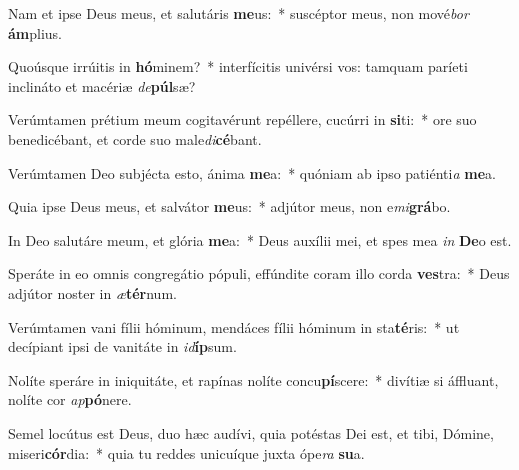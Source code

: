 \item Nam et ipse Deus meus, et salutáris \textbf{me}us:~* suscéptor meus, non mové\textit{bor} \textbf{ám}plius.
\item Quoúsque irrúitis in \textbf{hó}minem?~* interfícitis univérsi vos: tamquam paríeti inclináto et macériæ \textit{de}\textbf{púl}sæ?
\item Verúmtamen prétium meum cogitavérunt repéllere, cucúrri in \textbf{si}ti:~* ore suo benedicébant, et corde suo male\textit{di}\textbf{cé}bant.
\item Verúmtamen Deo subjécta esto, ánima \textbf{me}a:~* quóniam ab ipso patiénti\textit{a} \textbf{me}a.
\item Quia ipse Deus meus, et salvátor \textbf{me}us:~* adjútor meus, non e\textit{mi}\textbf{grá}bo.
\item In Deo salutáre meum, et glória \textbf{me}a:~* Deus auxílii mei, et spes mea \textit{in} \textbf{De}o est.
\item Speráte in eo omnis congregátio pópuli, effúndite coram illo corda \textbf{ves}tra:~* Deus adjútor noster in \textit{æ}\textbf{tér}num.
\item Verúmtamen vani fílii hóminum, mendáces fílii hóminum in sta\textbf{té}ris:~* ut decípiant ipsi de vanitáte in \textit{id}\textbf{íp}sum.
\item Nolíte speráre in iniquitáte, et rapínas nolíte concu\textbf{pí}scere:~* divítiæ si áffluant, nolíte cor \textit{ap}\textbf{pó}nere.
\item Semel locútus est Deus, duo hæc audívi, quia potéstas Dei est, et tibi, Dómine, miseri\textbf{cór}dia:~* quia tu reddes unicuíque juxta ópe\textit{ra} \textbf{su}a.
